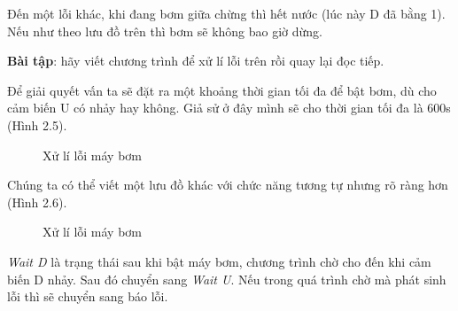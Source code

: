 Đến một lỗi khác, khi đang bơm giữa chừng thì hết nước (lúc này D đã bằng 1). Nếu như theo lưu đồ trên thì bơm sẽ không bao giờ dừng. 

\textbf{Bài tập}: hãy viết chương trình để xử lí lỗi trên rồi quay lại đọc tiếp.

Để giải quyết vấn ta sẽ đặt ra một khoảng thời gian tối đa để bật bơm, dù cho cảm biến U có nhảy hay không. Giả sử ở đây mình sẽ cho thời gian tối đa là 600s (Hình 2.5).

\begin{figure}[h!]
	\centering
{}
\caption{Xử lí lỗi máy bơm}
\end{figure}

Chúng ta có thể viết một lưu đồ khác với chức năng tương tự nhưng rõ ràng hơn (Hình 2.6).

\begin{figure}[h!]
	\centering
{}
\caption{Xử lí lỗi máy bơm}
\end{figure}

\textit{Wait D} là trạng thái sau khi bật máy bơm, chương trình chờ cho đến khi cảm biến D nhảy. Sau đó chuyển sang \textit{Wait U}. Nếu trong quá trình chờ mà phát sinh lỗi thì sẽ chuyển sang báo lỗi. 

